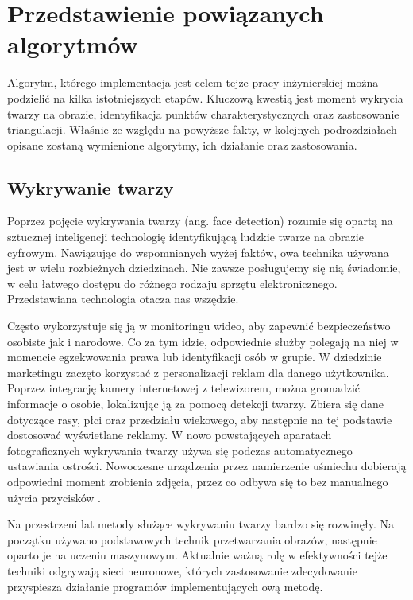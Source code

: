 \chapter{Przedstawienie powiązanych algorytmów}
\label{cha:analizaTeoretycznaProblemu}
Algorytm, którego implementacja jest celem tejże pracy inżynierskiej można podzielić na kilka istotniejszych etapów. Kluczową kwestią jest moment wykrycia twarzy na obrazie, identyfikacja punktów charakterystycznych oraz zastosowanie triangulacji. Właśnie ze względu na  powyższe fakty, w kolejnych podrozdziałach opisane zostaną wymienione algorytmy, ich działanie oraz zastosowania. 


\section{Wykrywanie twarzy}
Poprzez pojęcie wykrywania twarzy (ang. face detection) \cite{fDetection} rozumie się opartą na sztucznej inteligencji technologię identyfikującą ludzkie twarze na obrazie cyfrowym. Nawiązując do wspomnianych wyżej faktów, owa technika używana jest w wielu rozbieżnych dziedzinach. Nie zawsze posługujemy się nią świadomie, w celu łatwego dostępu do różnego rodzaju sprzętu elektronicznego. Przedstawiana technologia otacza nas wszędzie.

Często wykorzystuje się ją w monitoringu wideo, aby zapewnić bezpieczeństwo osobiste jak i narodowe. Co za tym idzie, odpowiednie służby polegają na niej w momencie egzekwowania prawa lub identyfikacji osób w grupie. W dziedzinie marketingu zaczęto korzystać z personalizacji reklam dla danego użytkownika. Poprzez integrację kamery internetowej z telewizorem, można gromadzić informacje o osobie, lokalizując ją za pomocą detekcji twarzy. Zbiera się dane dotyczące rasy, płci oraz przedziału wiekowego, aby następnie na tej podstawie dostosować wyświetlane reklamy. W nowo powstających aparatach fotograficznych wykrywania twarzy używa się podczas automatycznego ustawiania ostrości. Nowoczesne urządzenia przez namierzenie uśmiechu dobierają odpowiedni moment zrobienia zdjęcia, przez co odbywa się to bez manualnego użycia przycisków \cite{fDetection2}.

Na przestrzeni lat metody służące wykrywaniu twarzy bardzo się rozwinęły. Na początku używano podstawowych technik przetwarzania obrazów, następnie oparto je na uczeniu maszynowym. Aktualnie ważną rolę w efektywności tejże techniki odgrywają sieci neuronowe, których zastosowanie zdecydowanie przyspiesza działanie programów implementujących ową metodę.

